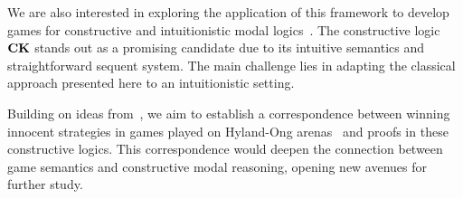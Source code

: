 We are also  interested in exploring the application of this framework to develop games for constructive and intuitionistic modal logics~\cite{Fitch,plotkin:stirling:86,Sim94,DBLP:journals/sLogica/BiermanP00}. The constructive logic $\textbf{CK}$ stands out as a promising candidate due to its intuitive semantics and straightforward sequent system. The main challenge lies in adapting the classical approach presented here to an intuitionistic setting. %

Building on ideas from~\cite{DBLP:conf/tableaux/AcclavioCS21,DBLP:conf/eumas/AcclavioC23}, we aim to establish a correspondence between winning innocent strategies in games played on Hyland-Ong arenas~\cite{DBLP:journals/iandc/HylandO00} and proofs in these constructive logics. This correspondence would deepen the connection between game semantics and constructive modal reasoning, opening new avenues for further study.

 
